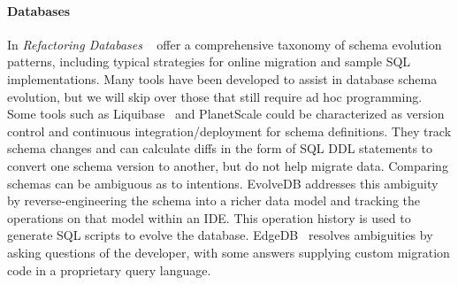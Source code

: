 \documentclass[english,submission]{programming}
\theoremstyle{definition}
\newcommand{\citet}[1]{\citeauthor*{#1}~\cite{#1}}
\begin{document}
\paragraph{Databases}
In \emph{Refactoring Databases} \citet{ambler06} offer a comprehensive taxonomy of schema evolution patterns, including typical strategies for online migration and sample SQL implementations.
Many tools have been developed to assist in database schema evolution, but we will skip over those that still require ad hoc programming.
Some tools such as Liquibase~\cite{liquibase} and PlanetScale\cite{planetscale} could be characterized as version control and continuous integration/deployment for schema definitions. They track schema changes and can calculate diffs in the form of SQL DDL statements to convert one schema version to another, but do not help migrate data. Comparing schemas can be ambiguous as to intentions.
EvolveDB\cite{evolvedb} addresses this ambiguity by reverse-engineering the schema into a richer data model and tracking the operations on that model within an IDE. This operation history is used to generate SQL scripts to evolve the database. EdgeDB~\cite{edgedb} resolves ambiguities by asking questions of the developer, with some answers supplying custom migration code in a proprietary query language.
\end{document}
